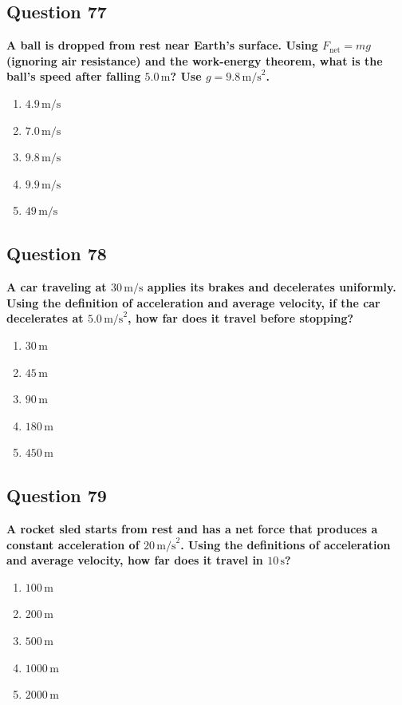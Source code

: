 \documentclass[12pt,letterpaper]{article}
\begin{document}
\subsection{Question 77}

\begin{questionbox}
\textbf{A ball is dropped from rest near Earth's surface. Using $F_{\text{net}} = mg$ (ignoring air resistance) and the work-energy theorem, what is the ball's speed after falling $5.0\,\text{m}$? Use $g = 9.8\,\text{m/s}^2$.}

\begin{enumerate}[label=\alph*)]
    \item $4.9\,\text{m/s}$
    \item $7.0\,\text{m/s}$
    \item $9.8\,\text{m/s}$
    \item $9.9\,\text{m/s}$
    \item $49\,\text{m/s}$
\end{enumerate}
\end{questionbox}

\subsection{Question 78}

\begin{questionbox}
\textbf{A car traveling at $30\,\text{m/s}$ applies its brakes and decelerates uniformly. Using the definition of acceleration and average velocity, if the car decelerates at $5.0\,\text{m/s}^2$, how far does it travel before stopping?}

\begin{enumerate}[label=\alph*)]
    \item $30\,\text{m}$
    \item $45\,\text{m}$
    \item $90\,\text{m}$
    \item $180\,\text{m}$
    \item $450\,\text{m}$
\end{enumerate}
\end{questionbox}

\subsection{Question 79}

\begin{questionbox}
\textbf{A rocket sled starts from rest and has a net force that produces a constant acceleration of $20\,\text{m/s}^2$. Using the definitions of acceleration and average velocity, how far does it travel in $10\,\text{s}$?}

\begin{enumerate}[label=\alph*)]
    \item $100\,\text{m}$
    \item $200\,\text{m}$
    \item $500\,\text{m}$
    \item $1000\,\text{m}$
    \item $2000\,\text{m}$
\end{enumerate}
\end{questionbox}
\end{document}
